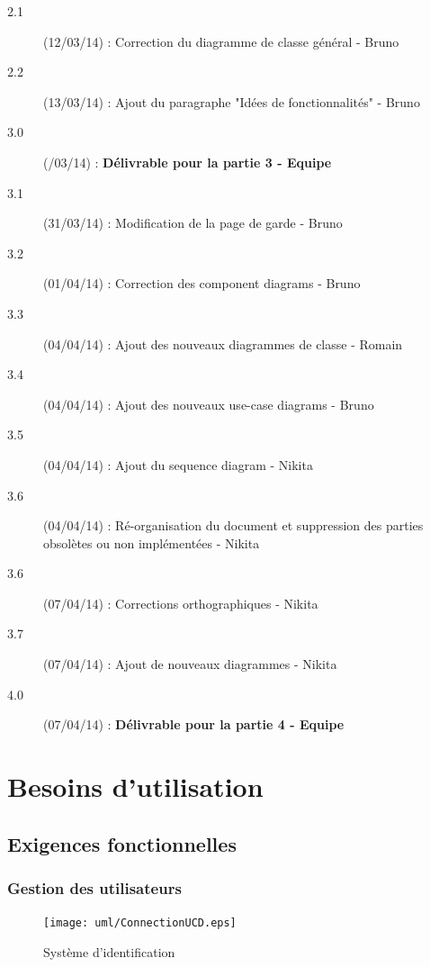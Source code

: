 \documentclass[a4paper]{report}
\begin{document}
\begin{description}
    \item[2.1] (12/03/14) : Correction du diagramme de classe général - Bruno
    \item[2.2] (13/03/14) : Ajout du paragraphe "Idées de fonctionnalités" - Bruno
    \item[3.0] (/03/14) : \textbf{Délivrable pour la partie 3 - Equipe}
    
    \item[3.1] (31/03/14) : Modification de la page de garde - Bruno
    \item[3.2] (01/04/14) : Correction des component diagrams - Bruno
    \item[3.3] (04/04/14) : Ajout des nouveaux diagrammes de classe - Romain
    \item[3.4] (04/04/14) : Ajout des nouveaux use-case diagrams - Bruno
    \item[3.5] (04/04/14) : Ajout du sequence diagram - Nikita
    \item[3.6] (04/04/14) : Ré-organisation du document et suppression des parties obsolètes ou non implémentées - Nikita
	\item[3.6] (07/04/14) : Corrections orthographiques - Nikita
	\item[3.7] (07/04/14) : Ajout de nouveaux diagrammes - Nikita
    
    \item[4.0] (07/04/14) : \textbf{Délivrable pour la partie 4 - Equipe}
    


\end{description}


\chapter{Besoins d'utilisation}
\section{Exigences fonctionnelles}

\subsection{Gestion des utilisateurs}

\begin{figure}[H]
    \begin{center}
        \texttt{[image: uml/ConnectionUCD.eps]}
        \caption{\label{diag-use-inscription} Système d'identification}
    \end{center}
\end{figure}
\end{document}
